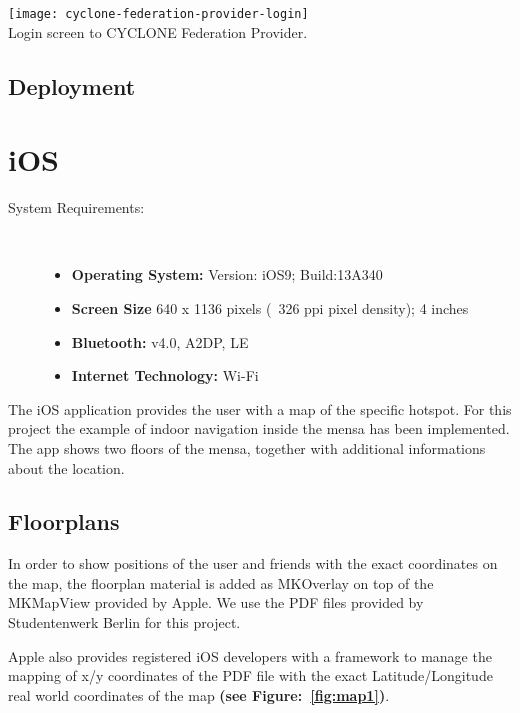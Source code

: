 \begin{center}
    \texttt{[image: cyclone-federation-provider-login]}\\
    Login screen to CYCLONE Federation Provider.
\end{center}

\subsection{Deployment}

\vspace{0.5cm}

\section{iOS}

\begin{description}
\item[System Requirements:] \hfill \\
\begin{itemize}
  \item \textbf{Operating System:} Version: iOS9; Build:13A340
  \item \textbf{Screen Size} 640 x 1136 pixels (~326 ppi pixel density); 4 inches
  \item \textbf{Bluetooth:} v4.0, A2DP, LE
  \item \textbf{Internet Technology:} Wi-Fi
\end{itemize}
\end{description}

The iOS application provides the user with a map of the specific hotspot. For this project the example of indoor navigation inside the mensa has been implemented. The app shows two floors of the mensa, together with additional informations about the location.

\subsection{Floorplans}
In order to show positions of the user and friends with the exact coordinates on the map, the floorplan material is added as MKOverlay on top of the MKMapView provided by Apple. We use the PDF files provided by Studentenwerk Berlin for this project.

Apple also provides registered iOS developers with a framework to manage the mapping of x/y coordinates of the PDF file with the exact Latitude/Longitude real world coordinates of the map
\textbf{(see Figure:~\ref{fig:map1})}.

